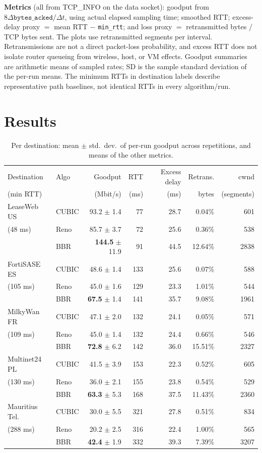 \documentclass[11pt]{article}
\begin{document}
\textbf{Metrics} (all from TCP\_INFO on the data socket): goodput from
$8\Delta\texttt{bytes\_acked}/\Delta t$, using actual elapsed sampling time;
smoothed RTT; excess-delay proxy $=$ mean RTT $-$ \texttt{min\_rtt}; and loss
proxy $=$ retransmitted bytes / TCP bytes sent. The plots use retransmitted
segments per interval. Retransmissions are not a direct packet-loss
probability, and excess RTT does not isolate router queueing from wireless,
host, or VM effects. Goodput summaries are arithmetic means of sampled rates;
SD is the sample standard deviation of the per-run means. The minimum RTTs
in destination labels describe representative path baselines, not identical
RTTs in every algorithm/run.

\section*{Results}

\begin{table}[!htbp]
\centering
\small
\caption{Per destination: mean $\pm$ std.\ dev.\ of per-run goodput across
repetitions, and means of the other metrics.}
\label{tab:dest}
\begin{tabular}{@{}llrrrrr@{}}
\toprule
Destination & Algo & Goodput & RTT & Excess delay & Retrans. & cwnd \\
(min RTT) & & (Mbit/s) & (ms) & (ms) & bytes & (segments) \\
\midrule
LeaseWeb US & CUBIC & 93.2 $\pm$ 1.4 & 77 & 28.7 & 0.04\% & 601 \\
(48 ms) & Reno & 85.7 $\pm$ 3.7 & 72 & 25.6 & 0.36\% & 538 \\
 & BBR & \textbf{144.5} $\pm$ 11.9 & 91 & 44.5 & 12.64\% & 2838 \\
\midrule
FortiSASE ES & CUBIC & 48.6 $\pm$ 1.4 & 133 & 25.6 & 0.07\% & 588 \\
(105 ms) & Reno & 45.0 $\pm$ 1.6 & 129 & 23.3 & 1.01\% & 544 \\
 & BBR & \textbf{67.5} $\pm$ 1.4 & 141 & 35.7 & 9.08\% & 1961 \\
\midrule
MilkyWan FR & CUBIC & 47.1 $\pm$ 2.0 & 132 & 24.1 & 0.05\% & 571 \\
(109 ms) & Reno & 45.0 $\pm$ 1.4 & 132 & 24.4 & 0.66\% & 546 \\
 & BBR & \textbf{72.8} $\pm$ 6.2 & 142 & 36.0 & 15.51\% & 2327 \\
\midrule
Multinet24 PL & CUBIC & 41.5 $\pm$ 3.9 & 153 & 22.3 & 0.52\% & 605 \\
(130 ms) & Reno & 36.0 $\pm$ 2.1 & 155 & 23.8 & 0.54\% & 529 \\
 & BBR & \textbf{63.3} $\pm$ 5.3 & 168 & 37.5 & 11.43\% & 2360 \\
\midrule
Mauritius Tel. & CUBIC & 30.0 $\pm$ 5.5 & 321 & 27.8 & 0.51\% & 834 \\
(288 ms) & Reno & 20.2 $\pm$ 2.5 & 316 & 22.4 & 1.00\% & 565 \\
 & BBR & \textbf{42.4} $\pm$ 1.9 & 332 & 39.3 & 7.39\% & 3207 \\
\bottomrule
\end{tabular}
\end{table}
\end{document}
